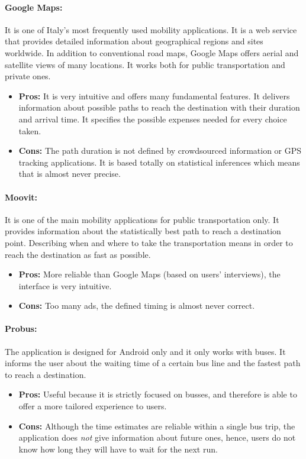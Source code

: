 \documentclass[a4paper, 11pt]{report}
\begin{document}
\paragraph{Google Maps:} It is one of Italy's most frequently used mobility applications. It is a web service that provides detailed information about geographical regions and sites worldwide. In addition to conventional road maps, Google Maps offers aerial and satellite views of many locations. It works both for public transportation and private ones.
\begin{itemize}
	\item \textbf{Pros:} It is very intuitive and offers many fundamental features. It delivers information about possible paths to reach the destination with their duration and arrival time. It specifies the possible expenses needed for every choice taken.
	\item \textbf{Cons:} The path duration is not defined by crowdsourced information or GPS tracking applications. It is based totally on statistical inferences which means that is almost never precise.
\end{itemize}

\paragraph{Moovit:}  It is one of the main mobility applications for public transportation only. It provides information about the statistically best path to reach a destination point. Describing when and where to take the transportation means in order to reach the destination as fast as possible.

\begin{itemize}
	\item \textbf{Pros:} More reliable than Google Maps (based on users' interviews), the interface is very intuitive.
	\item \textbf{Cons:} Too many ads, the defined timing is almost never correct.
\end{itemize}

\paragraph{Probus:}The application is designed for Android only and it only works with buses. It informs the user about the waiting time of a certain bus line and the fastest path to reach a destination.

\begin{itemize}
	\item \textbf{Pros:} Useful because it is strictly focused on busses, and therefore is able to offer a more tailored experience to users.
	\item \textbf{Cons:} Although the time estimates are reliable within a single bus trip, the application does \emph{not} give information about future ones, hence, users do not know how long they will have to wait for the next run.
\end{itemize}
\end{document}
